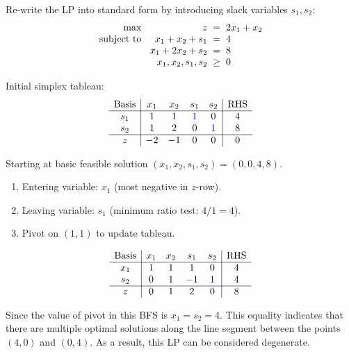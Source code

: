 \documentclass[a4paper, 10pt]{article}
\begin{document}
\begin{solution}
Re-write the LP into standard form by introducing slack variables \(s_1, s_2\):
\[
\begin{array}{@{\hspace{2mm}} r @{\hspace{2mm}} r @{\hspace{2mm}} c @{\hspace{2mm}} l}
    \text{max } & z & = & 2x_1 + x_2 \\
    \text{subject to } & x_1 + x_2 + s_1 & = & 4 \\
    & x_1 + 2x_2 + s_2 & = & 8 \\
    & x_1, x_2, s_1, s_2 & \geq & 0
\end{array}
\]

Initial simplex tableau:
\[
\begin{array}{c|cccc|c}
    \text{Basis} & x_1 & x_2 & s_1 & s_2 & \text{RHS} \\
    \hline
    s_1 & 1 & 1 & \textcolor[HTML]{0000FF}{1} & 0 & 4 \\
    s_2 & 1 & 2 & 0 & \textcolor[HTML]{0000FF}{1} & 8 \\
    \hline
    z & -2 & -1 & 0 & 0 & 0 \\
\end{array}
\]

\newpage

Starting at basic feasible solution \( (x_1, x_2, s_1, s_2) = (0, 0, 4, 8) \).
\begin{enumerate}
    \item Entering variable: \( x_1 \) (most negative in \( z \)-row).
    \item Leaving variable: \( s_1 \) (minimum ratio test: \( 4/1 = 4 \)).
    \item Pivot on \( (1,1) \) to update tableau.
\end{enumerate}
\[
\begin{array}{c|cccc|c}
    \text{Basis} & x_1 & x_2 & s_1 & s_2 & \text{RHS} \\
    \hline
    x_1 & \textcolor[HTML]{0000FF}{1} & 1 & 1 & 0 & 4 \\
    s_2 & 0 & 1 & -1 & \textcolor[HTML]{0000FF}{1} & 4 \\
    \hline
    z & 0 & 1 & 2 & 0 & 8 \\
\end{array}
\]

Since the value of pivot in this BFS is \( x_1 = s_2 = 4 \).
This equality indicates that there are multiple optimal solutions along the line segment between the points \( (4, 0) \) and \( (0, 4) \).
As a result, this LP can be considered degenerate.


\end{solution}
\end{document}
